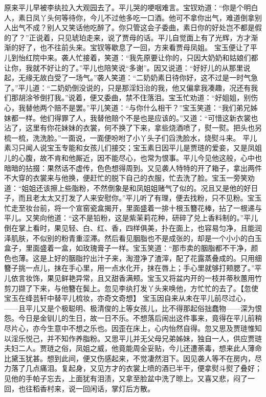 \documentclass[12pt,oneside]{book}
\begin{document}
原来平儿早被李纨拉入大观园去了。平儿哭的哽咽难言。宝钗劝道：“你是个明白人，素日凤丫头何等待你，今儿不过他多吃一口酒。他可不拿你出气，难道倒拿别人出气不成？别人又笑话他吃醉了。你只管这会子委曲，素日你的好处岂不都是假的了？”正说着，只见琥珀走来，说了贾母的话。平儿自觉面上有了光辉，方才渐渐的好了，也不往前头来。宝钗等歇息了一回，方来看贾母凤姐。
宝玉便让了平儿到怡红院中来。袭人忙接着，笑道：“我先原要让你的，只因大奶奶和姑娘们都让你，我就不好让的了。”平儿也陪笑说“多谢”。因又说道：“好好儿的从那里说起，无缘无故白受了一场气。”袭人笑道：“二奶奶素日待你好，这不过是一时气急了。”平儿道：“二奶奶倒没说的，只是那淫妇治的我，他又偏拿我凑趣，况还有我们那胡涂爷倒打我。”说着，便又委曲，禁不住落泪。宝玉忙劝道：“好姐姐，别伤心，我替他两个赔不是罢。”平儿笑道：“与你什么相干？”宝玉笑道：“我们弟兄姊妹都一样。他们得罪了人，我替他赔个不是也是应该的。”又道：“可惜这新衣裳也沾了，这里有你花妹妹的衣裳，何不换了下来，拿些烧酒喷了，熨一熨。把头也另梳一梳，洗洗脸。”一面说，一面便吩咐了小丫头子们舀洗脸水，烧熨斗来。
平儿素习只闻人说宝玉专能和女孩儿们接交；宝玉素日因平儿是贾琏的爱妾，又是凤姐儿的心腹，故不肯和他厮近，因不能尽心，也常为恨事。平儿今见他这般，心中也暗暗的拈掇：果然话不虚传，色色想得周到。又见袭人特特的开了箱子，拿出两件不大穿的衣裳来与他换，便赶忙的脱下自己的衣服，忙去洗了脸。宝玉一旁笑劝道：“姐姐还该擦上些脂粉，不然倒象是和凤姐姐赌气了似的。况且又是他的好日子，而且老太太又打发了人来安慰你。”平儿听了有理，便去找粉，只不见粉。宝玉忙走至妆台前，将一个宣窑瓷盒揭开，里面盛着一排十根玉簪花棒，拈了一根递与平儿。又笑向他道：“这不是铅粉，这是紫茉莉花种，研碎了兑上香料制的。”平儿倒在掌上看时，果见轻、白、红、香，四样俱美，扑在面上，也容易匀净，且能润泽肌肤，不似别的粉青重涩滞。然后看见胭脂也不是成张的，却是一个小小的白玉盒子，里面盛着一盒，如玫瑰膏子一样。宝玉笑道：“那市卖的胭脂都不干净，颜色也薄。这是上好的胭脂拧出汁子来，淘澄净了渣滓，配了花露蒸叠成的。只用细簪子挑一点儿，抹在手心里，用一点水化开，抹在唇上；手心里就够打颊腮了。”平儿依言妆饰，果见鲜艳异常，且又甜香满颊。宝玉又将盆内开的一枝并蒂秋蕙用竹剪刀撷了下来，与他簪在鬓上。忽见李纨打发丫头来唤他，方忙忙的去了。【忽使宝玉在绛芸轩中替平儿梳妆，亦奇文奇想】
宝玉因自来从未在平儿前尽过心，——且平儿又是个极聪明、极清俊的上等女孩儿，比不得那起俗拙蠢物——深为恨怨。今日是金钏儿的生日，故一日不乐。不想落后闹出这件事来，竟得在平儿前稍尽片心，亦今生意中不想之乐也。因歪在床上，心内怡然自得。忽又思及贾琏惟知以淫乐悦己，并不知作养脂粉。又思平儿并无父母兄弟姊妹，独自一人，供应贾琏夫妇二人。贾琏之俗，凤姐之威，他竟能周全妥贴，今儿还遭荼毒，想来此人薄命比黛玉犹甚。想到此间，便又伤感起来，不觉凄然泪下。因见袭人等不在房内，尽力落了几点痛泪。复起身，又见方才的衣裳上喷的酒已半干，便拿熨斗熨了叠好；见他的手帕子忘去，上面犹有泪渍，又拿至脸盆中洗了晾上。又喜又悲，闷了一回，也往稻香村来，说一回闲话，掌灯后方散。
\end{document}
